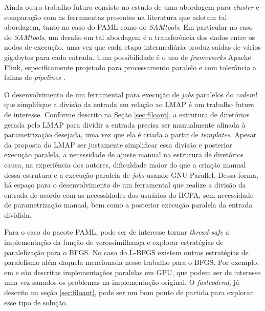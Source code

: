 \documentclass[cic,tc]{iiufrgs}
\begin{document}
Ainda outro trabalho futuro consiste no estudo de uma abordagem para
\textit{cluster} e comparação com as ferramentas presentes na literatura que
adotam tal abordagem, tanto no caso do PAML como do \textit{SAMtools}. Em particular no
caso do \textit{SAMtools}, um desafio em tal abordagem é a transferência dos dados entre
os nodos de execução, uma vez que cada etapa intermediária produz saídas de
vários gigabytes para cada entrada. Uma possibilidade é o uso de
\textit{frameworks} Apache Flink, especificamente projetado para processamento
paralelo e com tolerância a falhas de \textit{pipelines} \cite{carbone2015apache}.

O desenvolvimento de um ferramental para execução de \textit{jobs} paralelos do
\textit{codeml} que simplifique a divisão da entrada em relação ao LMAP é um trabalho
futuro de interesse. Conforme descrito na Seção \ref{sec:filoant}, a estrutura
de diretórios gerada pelo LMAP para dividir a entrada precisa ser manualmente
afinada à parametrização desejada, uma vez que ela é criada a partir de
\textit{templates}. Apesar da proposta do LMAP ser justamente simplificar essa
divisão e posterior execução paralela, a necessidade de ajuste manual na
estrutura de diretórios causa, na experiência dos autores, dificuldade maior do
que a criação manual dessa estrutura e a execução paralela de \textit{jobs} usando GNU
Parallel. Dessa forma, há espaço para o desenvolvimento de um ferramental que
realize a divisão da entrada de acordo com as necessidades dos usuários do
HCPA, sem necessidade de parametrização manual, bem como a posterior execução
paralela da entrada dividida.

Para o caso do pacote PAML, pode ser de interesse tornar \textit{thread-safe} a
implementação da função de verossimilhança e explorar estratégias de
paralelização para o BFGS. No caso do L-BFGS existem outras estratégias de
paralelismo além daquela mencionada nesse trabalho para o BFGS. Por exemplo, em
\cite{fei2014parallel} e \cite{sanseverino2014cuda} são descritas
implementações paralelas em GPU, que podem ser de interesse uma vez sanados os
problemas na implementação original. O \textit{fastcodeml}, já descrito na seção
\ref{sec:filoant}, pode ser um bom ponto de partida para explorar esse tipo de
solução.

%
%
%
%



\end{document}
